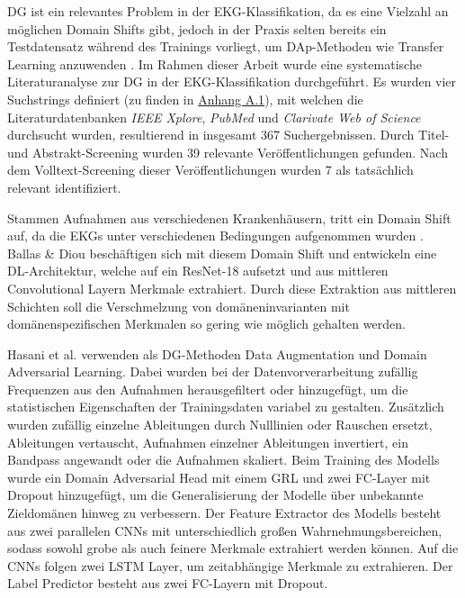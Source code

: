 \gls{DG} ist ein relevantes Problem in der \gls{EKG}-Klassifikation, da es eine Vielzahl an möglichen Domain Shifts gibt, jedoch in der Praxis selten bereits ein Testdatensatz während des Trainings vorliegt, um \gls{DAp}-Methoden wie Transfer Learning anzuwenden \cite{hasani_classification_2020}. Im Rahmen dieser Arbeit wurde eine systematische Literaturanalyse zur \gls{DG} in der \gls{EKG}-Klassifikation durchgeführt. Es wurden vier Suchstrings definiert (zu finden in \hyperref[sec:strings]{Anhang A.1}), mit welchen die Literaturdatenbanken \textit{IEEE Xplore}, \textit{PubMed} und \textit{Clarivate Web of Science} durchsucht wurden, resultierend in insgesamt 367 Suchergebnissen. Durch Titel- und Abstrakt-Screening wurden 39 relevante Veröffentlichungen gefunden. Nach dem Volltext-Screening dieser Veröffentlichungen wurden 7 als tatsächlich relevant identifiziert.    

Stammen Aufnahmen aus verschiedenen Krankenhäusern, tritt ein Domain Shift auf, da die \gls{EKG}s unter verschiedenen Bedingungen aufgenommen wurden \cite{hasani_classification_2020}. Ballas \& Diou \cite{ballas_domain_2022} \cite{ballas_towards_2024} beschäftigen sich mit diesem Domain Shift und entwickeln eine \gls{DL}-Architektur, welche auf ein \gls{ResNet}-18 aufsetzt und aus mittleren Convolutional Layern Merkmale extrahiert. Durch diese Extraktion aus mittleren Schichten soll die Verschmelzung von domäneninvarianten mit domänenspezifischen Merkmalen so gering wie möglich gehalten werden.

Hasani et al. \cite{hasani_classification_2020} verwenden als \gls{DG}-Methoden Data Augmentation und Domain Adversarial Learning. Dabei wurden bei der Datenvorverarbeitung zufällig Frequenzen aus den Aufnahmen herausgefiltert oder hinzugefügt, um die statistischen Eigenschaften der Trainingsdaten variabel zu gestalten. Zusätzlich wurden zufällig einzelne Ableitungen durch Nulllinien oder Rauschen ersetzt, Ableitungen vertauscht, Aufnahmen einzelner Ableitungen invertiert, ein Bandpass angewandt oder die Aufnahmen skaliert. Beim Training des Modells wurde ein Domain Adversarial Head mit einem \gls{GRL} und zwei \gls{FC}-Layer mit Dropout hinzugefügt, um die Generalisierung der Modelle über unbekannte Zieldomänen hinweg zu verbessern. Der Feature Extractor des Modells besteht aus zwei parallelen \gls{CNN}s mit unterschiedlich großen Wahrnehmungsbereichen, sodass sowohl grobe als auch feinere Merkmale extrahiert werden können. Auf die \gls{CNN}s folgen zwei \gls{LSTM} Layer, um zeitabhängige Merkmale zu extrahieren. Der Label Predictor besteht aus zwei \gls{FC}-Layern mit Dropout.

